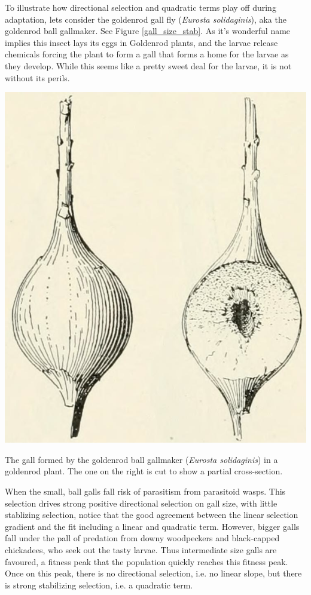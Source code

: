 To illustrate how directional selection and quadratic terms play off
during adaptation, lets consider the goldenrod gall fly ({\it Eurosta solidaginis}), aka the goldenrod
ball gallmaker. See Figure \ref{gall_size_stab}. As it's wonderful name
implies this insect lays its eggs in Goldenrod plants, and the larvae
release chemicals forcing the plant to form a gall that forms a home
for the larvae as they develop. While this seems like a pretty sweet
deal for the larvae, it is not without its perils. \begin{marginfigure}
\begin{center}
\includegraphics[width= 0.7 \textwidth]{illustration_images/Quant_gen/goldenrod_ball_gall_maker/goldenrod_ball_gall_maker.png}
\end{center}
\caption{The gall formed by the goldenrod
ball gallmaker ({\it Eurosta solidaginis}) in a goldenrod plant. The
one on the right is cut to show a partial cross-section.  }  
\end{marginfigure}
When the small, ball galls fall risk of parasitism from parasitoid
wasps. This selection drives strong positive directional selection on
gall size, with little stablizing selection, notice that the good
agreement between the linear selection gradient and the fit including
a linear and quadratic term. However, bigger galls fall under the pall of predation from downy
woodpeckers and black-capped chickadees, who seek out the tasty
larvae. Thus intermediate size galls are favoured, a fitness peak that
the population quickly reaches this fitness peak. Once on this peak,
there is no directional selection, i.e. no linear slope, but there
is strong stabilizing selection, i.e. a quadratic term. 

